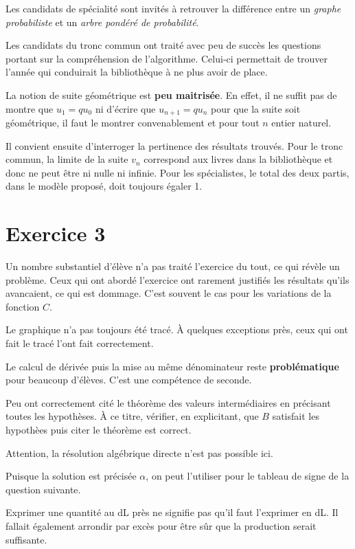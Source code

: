 \documentclass[a4paper,12Pt,french]{article}
\begin{document}
Les candidats de spécialité sont invités à retrouver la différence entre
un \emph{graphe probabiliste} et un \emph{arbre pondéré de probabilité}.

Les candidats du tronc commun ont traité avec peu de succès les
questions portant sur la compréhension de l'algorithme. Celui-ci
permettait de trouver l'année qui conduirait la bibliothèque à ne plus
avoir de place.

La notion de suite géométrique est \textbf{peu maitrisée}. En effet, il
ne suffit pas de montre que $u_1 = qu_0$ ni d'écrire que $u_{n+1} =
qu_n$ pour que la suite soit géométrique, il faut le montrer
convenablement et pour tout $n$ entier naturel.

Il convient ensuite d'interroger la pertinence des résultats trouvés.
Pour le tronc commun, la limite de la suite $v_n$ correspond aux livres
dans la bibliothèque et donc ne peut être ni nulle ni infinie. Pour les
spécialistes, le total des deux partis, dans le modèle proposé, doit
toujours égaler 1.

\section{Exercice 3}

Un nombre substantiel d'élève n'a pas traité l'exercice du tout, ce qui
révèle un problème. Ceux qui ont abordé l'exercice ont rarement
justifiés les résultats qu'ils avancaient, ce qui est dommage. C'est
souvent le cas pour les variations de la fonction $C$.

Le graphique n'a pas toujours été tracé. À quelques exceptions près,
ceux qui ont fait le tracé l'ont fait correctement.

Le calcul de dérivée puis la mise au même dénominateur reste
\textbf{problématique} pour beaucoup d'élèves. C'est une compétence de
seconde.

Peu ont correctement cité le théorème des valeurs intermédiaires en
précisant toutes les hypothèses. À ce titre, vérifier, en explicitant,
que $B$ satisfait les hypothèes puis citer le théorème est correct.

Attention, la résolution algébrique directe n'est pas possible ici.

Puisque la solution est précisée $\alpha$, on peut l'utiliser pour le
tableau de signe de la question suivante.

Exprimer une quantité au dL près ne signifie pas qu'il faut l'exprimer
en dL. Il fallait également arrondir par excès pour être sûr que la
production serait suffisante.
\end{document}
